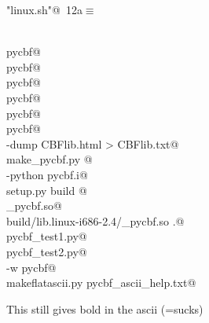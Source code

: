 \documentclass[10pt,a4paper,twoside,notitlepage]{article}
\begin{document}
\begin{flushleft} \small
\begin{minipage}{\linewidth}\label{scrap11}\raggedright\small
{} \verb@"linux.sh"@\nobreak\ {\footnotesize {12a}}$\equiv$
\vspace{-1ex}
\begin{list}{}{} \item
\mbox{}\verb@@\\
\mbox{}\verb@nuweb pycbf@\\
\mbox{}\verb@latex pycbf@\\
\mbox{}\verb@nuweb pycbf@\\
\mbox{}\verb@latex pycbf@\\
\mbox{}\verb@dvipdfm pycbf@\\
\mbox{}\verb@nuweb pycbf@\\
\mbox{}\verb@lynx -dump CBFlib.html > CBFlib.txt@\\
\mbox{}\verb@python make_pycbf.py @\\
\mbox{}\verb@swig -python pycbf.i@\\
\mbox{}\verb@python setup.py build @\\
\mbox{}\verb@rm _pycbf.so@\\
\mbox{}\verb@cp build/lib.linux-i686-2.4/_pycbf.so .@\\
\mbox{}\verb@python pycbf_test1.py@\\
\mbox{}\verb@python pycbf_test2.py@\\
\mbox{}\verb@pydoc -w pycbf@\\
\mbox{}\verb@python makeflatascii.py pycbf_ascii_help.txt@\\
\mbox{}\verb@@{\NWsep}
\end{list}
\vspace{-1.5ex}
\footnotesize
\begin{list}{}{\setlength{\itemsep}{-\parsep}\setlength{\itemindent}{-\leftmargin}}

\item{}
\end{list}
\end{minipage}\vspace{4ex}
\end{flushleft}
This still gives bold in the ascii (=sucks)
\end{document}
